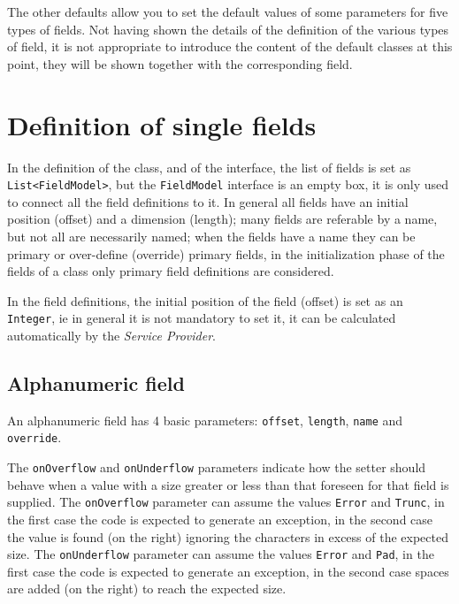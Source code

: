 \documentclass[a4paper,10pt]{report}
\begin{document}
The other defaults allow you to set the default values of some parameters for 
five types of fields. Not having shown the details of the definition of the 
various types of field, it is not appropriate to introduce the content of the 
default classes at this point, they will be shown together with the 
corresponding field.

\chapter{Definition of single fields}
In the definition of the class, and of the interface, the list of fields is set 
as \verb!List<FieldModel>!, but the \verb!FieldModel! interface is an empty box, 
it is only used to connect all the field definitions to it.
In general all fields have an initial position (offset) and a dimension 
(length); many fields are referable by a name, but not all are necessarily 
named; when the fields have a name they can be primary or over-define (override) 
primary fields, in the initialization phase of the fields of a class only 
primary field definitions are considered.

In the field definitions, the initial position of the field (offset) is set as 
an \texttt{Integer}, ie in general it is not mandatory to set it, it can be 
calculated automatically by the \textsl{Service Provider}.

\section{Alphanumeric field}
An alphanumeric field has 4 basic parameters: \verb!offset!, \verb!length!, 
\verb!name! and \verb!override!.

The \verb!onOverflow! and \verb!onUnderflow! parameters indicate how the setter 
should behave when a value with a size greater or less than that foreseen for 
that field is supplied. 
The \hypertarget{abc:ovf}{\texttt{onOverflow}} parameter can assume the values 
\verb!Error! and \verb!Trunc!, in the first case the code is expected to 
generate an exception, in the second case the value is found (on the right) 
ignoring the characters in excess of the expected size. 
The \hypertarget{abc:unf}{\texttt{onUnderflow}} parameter can assume the values 
\verb!Error! and \verb!Pad!, in the first case the code is expected to generate 
an exception, in the second case spaces are added (on the right) to reach the 
expected size.
\end{document}
